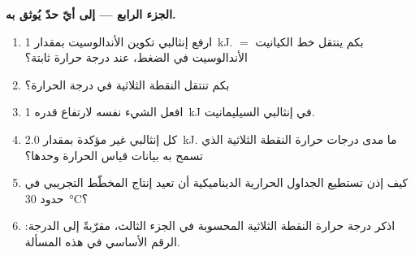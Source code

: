 \begin{problem}
\noindent\textbf{الجزء الرابع --- إلى أيّ حدّ يُوثق به.}
\begin{enumerate}[resume]
\item ارفع إنثالبي تكوين الأندالوسيت بمقدار \qty{1}{kJ}. بكم ينتقل
خط الكيانيت $=$ الأندالوسيت في الضغط، عند درجة حرارة ثابتة؟
\item بكم تنتقل النقطة الثلاثية في درجة الحرارة؟
\item افعل الشيء نفسه لارتفاع قدره \qty{1}{kJ} في إنثالبي السيليمانيت.
\item كل إنثالبي غير مؤكدة بمقدار \qty{2.0}{kJ}. ما مدى درجات حرارة
النقطة الثلاثية الذي تسمح به بيانات قياس الحرارة وحدها؟
\item كيف إذن تستطيع الجداول الحرارية الديناميكية أن تعيد إنتاج المخطّط التجريبي في حدود
\qty{30}{\celsius}؟
\item اذكر درجة حرارة النقطة الثلاثية المحسوبة في الجزء الثالث، مقرّبةً إلى
الدرجة: الرقم الأساسي في هذه المسألة.
\end{enumerate}
\end{problem}
